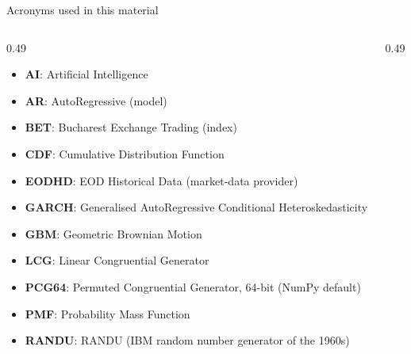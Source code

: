 {
\begin{frame}[noframenumbering]
    \titlepage
\end{frame}
}
\begin{frame}{Acronyms used in this material}
\begin{columns}[T]
\begin{column}{0.49\textwidth}
\begin{itemize}\setlength{\itemsep}{0pt}
    \item \textbf{AI}: Artificial Intelligence
    \item \textbf{AR}: AutoRegressive (model)
    \item \textbf{BET}: Bucharest Exchange Trading (index)
    \item \textbf{CDF}: Cumulative Distribution Function
    \item \textbf{EODHD}: EOD Historical Data (market-data provider)
    \item \textbf{GARCH}: Generalised AutoRegressive Conditional Heteroskedasticity
    \item \textbf{GBM}: Geometric Brownian Motion
    \item \textbf{LCG}: Linear Congruential Generator
    \item \textbf{PCG64}: Permuted Congruential Generator, 64-bit (NumPy default)
    \item \textbf{PMF}: Probability Mass Function
    \item \textbf{RANDU}: RANDU (IBM random number generator of the 1960s)
\end{itemize}
\end{column}
\begin{column}{0.49\textwidth}
\end{column}
\end{columns}
\end{frame}

